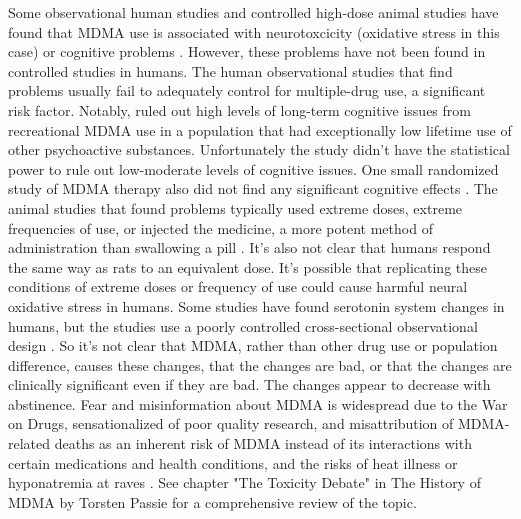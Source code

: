 \documentclass[12pt,letterpaper]{book}
\begin{document}
\begin{itemize}
    	Some observational human studies and controlled high-dose animal studies have found that MDMA use is associated with neurotoxcicity (oxidative stress in this case) or cognitive problems \cite{passieHistory}. However, these problems have not been found in controlled studies in humans. The human observational studies that find problems usually fail to adequately control for multiple-drug use, a significant risk factor. Notably, \textcite{halpernMormonRavers} ruled out high levels of long-term cognitive issues from recreational MDMA use in a population that had exceptionally low lifetime use of other psychoactive substances. Unfortunately the study didn't have the statistical power to rule out low-moderate levels of cognitive issues. One small randomized study of MDMA therapy also did not find any significant cognitive effects \cite{mithoeferSafety}. The animal studies that found problems typically used extreme doses, extreme frequencies of use, or injected the medicine, a more potent method of administration than swallowing a pill \cite{passieHistory}. It's also not clear that humans respond the same way as rats to an equivalent dose. It's possible that replicating these conditions of extreme doses or frequency of use could cause harmful neural oxidative stress in humans. Some studies have found serotonin system changes in humans, but the studies use a poorly controlled cross-sectional observational design \cite{van2022serotonin}. So it's not clear that MDMA, rather than other drug use or population difference, causes these changes, that the changes are bad, or that the changes are clinically significant even if they are bad. The changes appear to decrease with abstinence. Fear and misinformation about MDMA is widespread due to the War on Drugs, sensationalized of poor quality research, and misattribution of MDMA-related deaths as an inherent risk of MDMA instead of its interactions with certain medications and health conditions, and the risks of heat illness or hyponatremia at raves \cite{passieHistory}. See chapter "The Toxicity Debate" in The History of MDMA by Torsten Passie for a comprehensive review of the topic.
	

\end{itemize}
\end{document}
